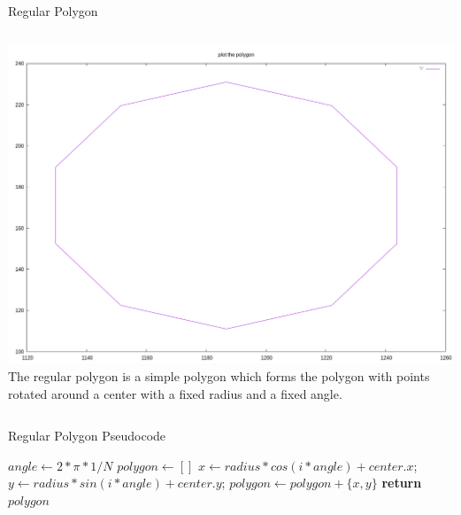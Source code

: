 \documentclass{beamer}
\begin{document}
\begin{frame}{Regular Polygon}
  \begin{block}{}
    \begin{columns}[onlytextwidth,T]
      \column{\dimexpr\linewidth-40mm}
      \includegraphics[width=0.5\paperwidth]{figures/kk-regular-polygon-10-0-0.png}
      \column{40mm}
      The regular polygon is a simple polygon which forms the polygon with
      points rotated around a center with a fixed radius and a fixed angle.
    \end{columns}
  \end{block}
\end{frame}

\begin{frame}{Regular Polygon Pseudocode}
  \begin{algorithm}[H]
    \begin{algorithmic}[0]
        \State $angle \gets 2 * \pi * 1 / N$
        \State $polygon \gets []$
          \State $x \gets radius * cos(i * angle) + center.x$;
          \State $y \gets radius * sin(i * angle) + center.y$;
          \State $polygon \gets polygon + \{x,y\}$
        \EndFor
        \State \textbf{return} $polygon$
      \EndProcedure
    \end{algorithmic}
  \end{algorithm}
\end{frame}
\end{document}
